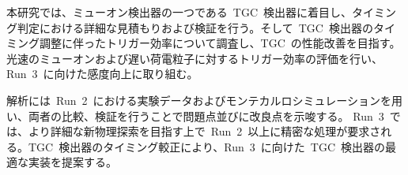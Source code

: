 本研究では、ミューオン検出器の一つである~TGC~検出器に着目し、タイミング判定における詳細な見積もりおよび検証を行う。そして~TGC~検出器のタイミング調整に伴ったトリガー効率について調査し、TGC~の性能改善を目指す。光速のミューオンおよび遅い荷電粒子に対するトリガー効率の評価を行い、Run~3~に向けた感度向上に取り組む。

解析には~Run~2~における実験データおよびモンテカルロシミュレーションを用い、両者の比較、検証を行うことで問題点並びに改良点を示唆する。
Run~3~では、より詳細な新物理探索を目指す上で~Run~2~以上に精密な処理が要求される。TGC~検出器のタイミング較正により、Run~3~に向けた~TGC~検出器の最適な実装を提案する。

